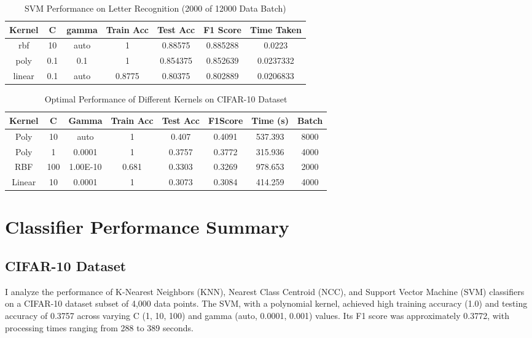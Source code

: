 \documentclass[conference]{IEEEtran}
\begin{document}
\begin{table}[H]
\centering
\caption{SVM Performance on Letter Recognition (2000 of 12000 Data Batch)}
\begin{tabular}{|c|c|c|c|c|c|c|}
\hline
Kernel & C & gamma & Train Acc & Test Acc & F1 Score & Time Taken\\ \hline
rbf & 10 & auto &1 & 0.88575 & 0.885288 & 0.0223\\ \hline
poly & 0.1 & 0.1 &1 & 0.854375 & 0.852639 & 0.0237332\\ \hline
linear & 0.1 & auto &0.8775 & 0.80375 & 0.802889 & 0.0206833\\ \hline
\end{tabular}
\end{table}


\begin{table}[H]
\centering
\caption{Optimal Performance of Different Kernels on CIFAR-10 Dataset}
\begin{tabular}{|c|c|c|c|c|c|c|c|}
\hline
Kernel & C & Gamma &Train Acc & Test Acc & F1Score & Time (s) & Batch \\ \hline
Poly & 10 & auto & 1 & 0.407 & 0.4091 & 537.393 & 8000 \\ \hline
Poly & 1 & 0.0001 & 1 & 0.3757 & 0.3772 & 315.936 & 4000 \\ \hline
RBF & 100 & 1.00E-10 & 0.681 & 0.3303 & 0.3269 & 978.653 & 2000 \\ \hline
Linear & 10& 0.0001 & 1 & 0.3073 & 0.3084 & 414.259 & 4000 \\ \hline
\end{tabular}
\end{table}	


\section{Classifier Performance Summary}

\subsection{CIFAR-10 Dataset}
I analyze the performance of K-Nearest Neighbors (KNN), Nearest Class Centroid (NCC), and Support Vector Machine (SVM) classifiers on a CIFAR-10 dataset subset of 4,000 data points. The SVM, with a polynomial kernel, achieved high training accuracy (1.0) and testing accuracy of 0.3757 across varying C (1, 10, 100) and gamma (auto, 0.0001, 0.001) values. Its F1 score was approximately 0.3772, with processing times ranging from 288 to 389 seconds.
\end{document}
